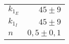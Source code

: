 \begin{tabular}{lr}
\toprule
$k_{1_E}$                 &    $   45\pm 9 $\\
$k_{1_I}$                 &    $   45\pm 9 $\\
\midrule                                  
$n$                   &        $0,5 \pm0,1$ \\
\bottomrule
\end{tabular}
